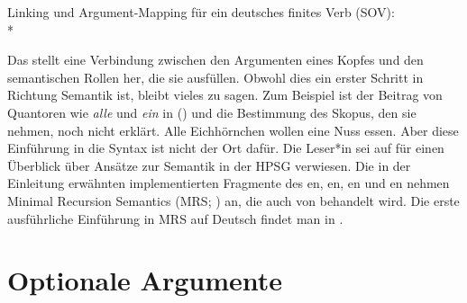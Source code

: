 \ex Linking und Argument-Mapping für ein deutsches finites Verb (SOV):\\*
\zl

\noindent
Das stellt eine Verbindung zwischen den Argumenten eines Kopfes und den semantischen Rollen her, die sie ausfüllen. Obwohl dies
ein erster Schritt in Richtung Semantik ist, bleibt vieles zu sagen. Zum Beispiel ist der Beitrag von
Quantoren wie \emph{alle} und \emph{ein} in () und die Bestimmung des Skopus, den sie nehmen, noch nicht erklärt.
\ea
Alle Eichhörnchen wollen eine Nuss essen.
\z
Aber diese Einführung in die Syntax ist nicht der Ort dafür. Die Leser*in sei auf
 für einen Überblick über Ansätze zur Semantik in der HPSG verwiesen. Die in der Einleitung erwähnten implementierten Fragmente des
en, en, en und en nehmen Minimal Recursion Semantics (MRS; \citealt{CFPS2005a}) an, die
auch von \citet[Abschnitt~6.1]{KoenigRichter2024a} behandelt wird. Die erste ausführliche Einführung
in MRS auf Deutsch findet man in .

\section{Optionale Argumente}
\label{sec-optional-arguments}


